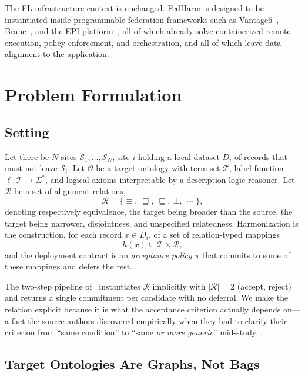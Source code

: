 \documentclass[conference]{IEEEtran}
\newcommand{\silo}{\mathcal{S}}
\newcommand{\onto}{\mathcal{O}}
\begin{document}
The FL infrastructure context is unchanged. FedHarm is designed to be instantiated inside programmable federation frameworks such as Vantage6~\cite{b34}, Brane~\cite{b33}, and the EPI platform~\cite{b35}, all of which already solve containerized remote execution, policy enforcement, and orchestration, and all of which leave data alignment to the application.

\section{Problem Formulation}
\label{sec:formulation}

\subsection{Setting}

Let there be $N$ sites $\silo_1,\dots,\silo_N$, site $i$ holding a local dataset $D_i$ of records that must not leave $\silo_i$. Let $\onto$ be a target ontology with term set $\mathcal{T}$, label function $\ell : \mathcal{T} \to \Sigma^{*}$, and logical axioms interpretable by a description-logic reasoner. Let $\mathcal{R}$ be a set of alignment relations,
\begin{equation}
\mathcal{R} = \{\equiv,\ \sqsupseteq,\ \sqsubseteq,\ \bot,\ \sim\},
\end{equation}
denoting respectively equivalence, the target being broader than the source, the target being narrower, disjointness, and unspecified relatedness. Harmonization is the construction, for each record $x \in D_i$, of a set of relation-typed mappings
\begin{equation}
h(x) \subseteq \mathcal{T} \times \mathcal{R},
\end{equation}
and the deployment contract is an \emph{acceptance policy} $\pi$ that commits to some of these mappings and defers the rest.

The two-step pipeline of~\cite{b1} instantiates $\mathcal{R}$ implicitly with $|\mathcal{R}| = 2$ (accept, reject) and returns a single commitment per candidate with no deferral. We make the relation explicit because it is what the acceptance criterion actually depends on---a fact the source authors discovered empirically when they had to clarify their criterion from ``same condition'' to ``same \emph{or more generic}'' mid-study~\cite{b1}.

\subsection{Target Ontologies Are Graphs, Not Bags}
\end{document}
